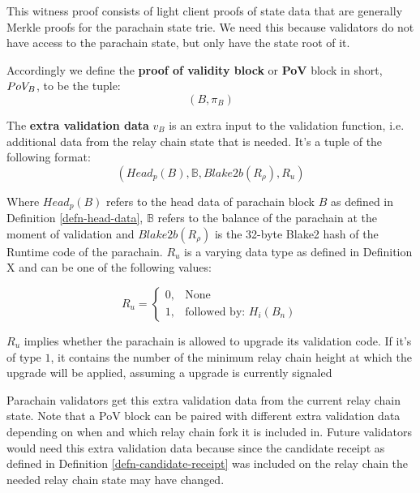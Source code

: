 This witness proof consists of light client proofs of state data that are
generally Merkle proofs for the parachain state trie.  We need this because
validators do not have access to the parachain state, but only have the state
root of it.

\begin{definition}
  \label{defn-pov-block}
  Accordingly we define the {\bf proof of validity block} or {\bf PoV} block in
  short, {\bf $PoV_B$}, to be the tuple:
  \[
  (B, \pi_B)
  \]
\end{definition}

\begin{definition}  \label{defn-extra-validation-data}
  The \textbf{extra validation data} $v_B$  is an extra input to the validation
  function, i.e. additional data from the relay chain state that is needed.
  It's a tuple of the following format:
  \[
  (Head_p(B), \mathbb{B}, Blake2b(R_\rho), R_u)
  \]

  Where $Head_p(B)$ refers to the head data of parachain block $B$ as defined in
  Definition \ref{defn-head-data}, $\mathbb{B}$ refers to the balance of the
  parachain at the moment of validation  and
  $Blake2b(R_\rho)$ is the 32-byte Blake2 hash of the Runtime code of the
  parachain. $R_u$ is a varying data type as defined in Definition X
   and can be one of the following values:

  \begin{equation*}
    R_u =
    \begin{cases}
      0, & \text{None} \\
      1, & \text{followed by: } H_i(B_n)
    \end{cases}
  \end{equation*}

  $R_u$ implies whether the parachain is allowed to upgrade its validation code.
  If it's of type $1$, it contains the number of the minimum relay chain height
  at which the upgrade will be applied, assuming a upgrade is currently signaled
  \newline

  Parachain validators get this extra validation data from the current relay
  chain state. Note that a PoV block can be paired with different extra
  validation data depending on when and which relay chain fork it is included
  in. Future validators would need this extra validation data because since the
  candidate receipt as defined in Definition \ref{defn-candidate-receipt} was
  included on the relay chain the needed relay chain state may have changed.
\end{definition}

